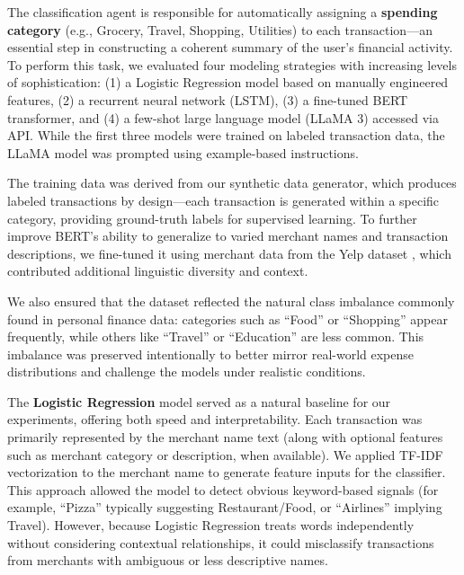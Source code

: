 \documentclass[conference]{IEEEtran}
\begin{document}
The classification agent is responsible for automatically assigning a \textbf{spending category} (e.g., Grocery, Travel, Shopping, Utilities) to each transaction—an essential step in constructing a coherent summary of the user's financial activity. To perform this task, we evaluated four modeling strategies with increasing levels of sophistication: (1) a Logistic Regression model based on manually engineered features, (2) a recurrent neural network (LSTM), (3) a fine-tuned BERT transformer, and (4) a few-shot large language model (LLaMA 3) accessed via API. While the first three models were trained on labeled transaction data, the LLaMA model was prompted using example-based instructions. 

The training data was derived from our synthetic data generator, which produces labeled transactions by design—each transaction is generated within a specific category, providing ground-truth labels for supervised learning. To further improve BERT’s ability to generalize to varied merchant names and transaction descriptions, we fine-tuned it using merchant data from the Yelp dataset \cite{yelpdata2023}, which contributed additional linguistic diversity and context. 

We also ensured that the dataset reflected the natural class imbalance commonly found in personal finance data: categories such as “Food” or “Shopping” appear frequently, while others like “Travel” or “Education” are less common. This imbalance was preserved intentionally to better mirror real-world expense distributions and challenge the models under realistic conditions.


The \textbf{Logistic Regression} model served as a natural baseline for our experiments, offering both speed and interpretability. Each transaction was primarily represented by the merchant name text (along with optional features such as merchant category or description, when available). We applied TF-IDF vectorization to the merchant name to generate feature inputs for the classifier. This approach allowed the model to detect obvious keyword-based signals (for example, “Pizza” typically suggesting Restaurant/Food, or “Airlines” implying Travel). However, because Logistic Regression treats words independently without considering contextual relationships, it could misclassify transactions from merchants with ambiguous or less descriptive names.
\end{document}

